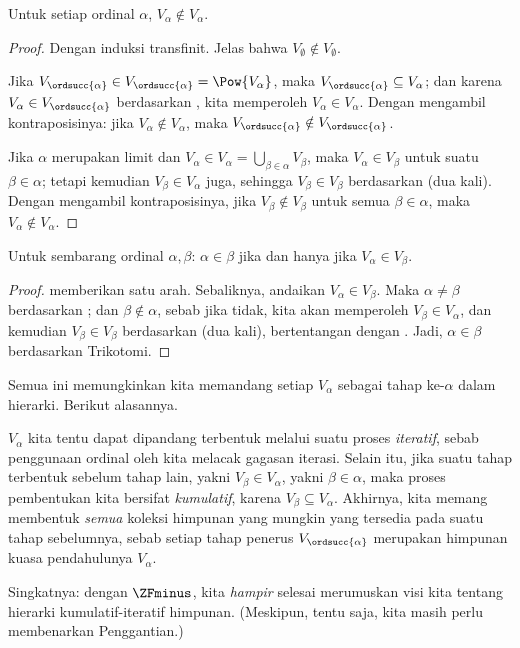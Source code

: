 \documentclass[../../../include/open-logic-section]{subfiles}
\begin{document}
\begin{lem}
Untuk setiap ordinal $\alpha$, $V_\alpha \notin V_\alpha$.
\end{lem}

\begin{proof}
Dengan induksi transfinit. Jelas bahwa
$V_\emptyset \notin V_\emptyset$.

Jika $V_{\ordsucc{\alpha}} \in V_{\ordsucc{\alpha}} = \Pow{V_\alpha}$,
maka $V_{\ordsucc{\alpha}} \subseteq V_\alpha$; dan karena
$V_\alpha \in V_{\ordsucc{\alpha}}$ berdasarkan
, kita memperoleh $V_\alpha \in V_\alpha$.
Dengan mengambil kontraposisinya: jika $V_\alpha \notin V_\alpha$, maka
$V_{\ordsucc{\alpha}} \notin V_{\ordsucc{\alpha}}$.

Jika $\alpha$ merupakan limit dan
$V_\alpha \in V_\alpha = \bigcup_{\beta \in \alpha}V_\beta$, maka
$V_\alpha \in V_\beta$ untuk suatu $\beta \in \alpha$; tetapi kemudian
$V_\beta \in V_\alpha$ juga, sehingga $V_\beta \in V_\beta$ berdasarkan
 (dua kali). Dengan mengambil kontraposisinya, jika
$V_\beta \notin V_\beta$ untuk semua $\beta \in \alpha$, maka
$V_\alpha \notin V_\alpha$.
\end{proof}

\begin{cor}
Untuk sembarang ordinal $\alpha, \beta$: $\alpha \in \beta$ jika dan hanya
jika $V_\alpha \in V_\beta$.
\end{cor}

\begin{proof}
 memberikan satu arah. Sebaliknya, andaikan
$V_\alpha \in V_\beta$. Maka $\alpha \neq \beta$ berdasarkan
; dan $\beta \notin \alpha$, sebab jika tidak, kita akan
memperoleh $V_\beta \in V_\alpha$, dan kemudian
$V_\beta \in V_\beta$ berdasarkan  (dua kali),
bertentangan dengan . Jadi, $\alpha \in \beta$
berdasarkan Trikotomi.
\end{proof}
\noindent
Semua ini memungkinkan kita memandang setiap $V_\alpha$ sebagai tahap
ke-$\alpha$ dalam hierarki. Berikut alasannya.

$V_\alpha$ kita tentu dapat dipandang terbentuk melalui suatu proses
\emph{iteratif}, sebab penggunaan ordinal oleh kita melacak gagasan iterasi.
Selain itu, jika suatu tahap terbentuk sebelum tahap lain, yakni
$V_\beta \in V_\alpha$, yakni $\beta \in \alpha$, maka proses pembentukan
kita bersifat \emph{kumulatif}, karena $V_\beta \subseteq V_\alpha$.
Akhirnya, kita memang membentuk \emph{semua} koleksi himpunan yang mungkin
yang tersedia pada suatu tahap sebelumnya, sebab setiap tahap penerus
$V_{\ordsucc{\alpha}}$ merupakan himpunan kuasa pendahulunya $V_\alpha$.

Singkatnya: dengan $\ZFminus$, kita \emph{hampir} selesai merumuskan visi
kita tentang hierarki kumulatif-iteratif himpunan. (Meskipun, tentu saja, kita
masih perlu membenarkan Penggantian.)
\end{document}
